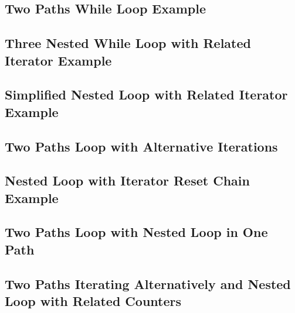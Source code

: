 \subsection{Two Paths While Loop Example}

\subsection{Three Nested While Loop with Related Iterator Example}

\subsection{Simplified Nested Loop with Related Iterator Example}

\subsection{Two Paths Loop with Alternative Iterations}


\subsection{Nested Loop with Iterator Reset Chain Example}

\subsection{Two Paths Loop with Nested Loop in One Path}


\subsection{Two Paths Iterating Alternatively and Nested Loop with Related Counters}


